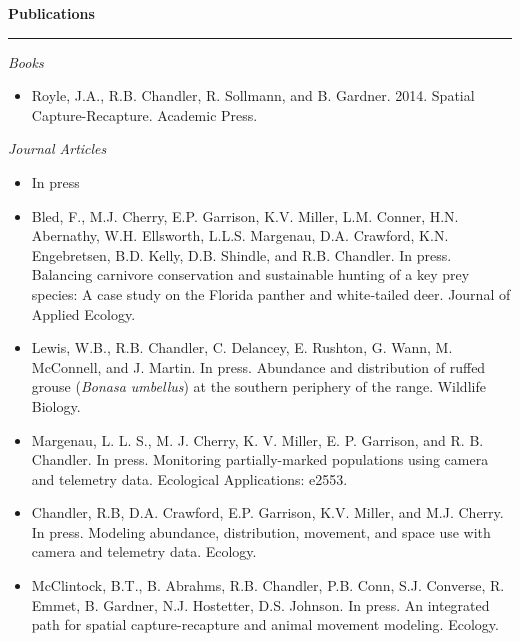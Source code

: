 \vspace{0.5cm}

{\large \bf Publications} \\
\rule[3mm]{\textwidth}{0.3mm}

\emph{Books}
\begin{itemize}

\item Royle, J.A., R.B. Chandler, R. Sollmann, and B. Gardner. 2014. Spatial
Capture-Recapture. Academic Press. 

\end{itemize}

\vspace{0.5cm}

\emph{Journal Articles}

\begin{itemize}


\item[] {\centering In press \\}

\item Bled, F., M.J. Cherry, E.P. Garrison, K.V. Miller, L.M. Conner,
  H.N. Abernathy, W.H. Ellsworth, L.L.S. Margenau, D.A. Crawford,
  K.N. Engebretsen, B.D. Kelly, D.B. Shindle, and R.B. Chandler. In
  press. Balancing carnivore conservation and sustainable hunting of a
  key prey species: A case study on the Florida panther and
  white‐tailed deer. Journal of Applied Ecology.
  
\item Lewis, W.B., R.B. Chandler, C. Delancey, E. Rushton, G. Wann, M.
  McConnell, and J. Martin. In press. Abundance and distribution of
  ruffed grouse ({{\it Bonasa umbellus}}) at the southern periphery of
  the range. Wildlife Biology. 

\item Margenau, L. L. S., M. J. Cherry, K. V. Miller, E. P. Garrison,
  and R. B. Chandler. In press. Monitoring partially-marked
  populations using camera and telemetry data. Ecological
  Applications: e2553. 

\item Chandler, R.B, D.A. Crawford, E.P. Garrison, K.V. Miller, and
  M.J. Cherry. In press. Modeling abundance, distribution, movement,
  and space use with camera and telemetry data. Ecology.  

\item McClintock, B.T., B. Abrahms, R.B. Chandler, P.B. Conn,
  S.J. Converse, R. Emmet, B. Gardner, N.J. Hostetter,
  D.S. Johnson. In press. An integrated path for spatial
  capture-recapture and animal movement modeling. Ecology. 


\end{itemize}
